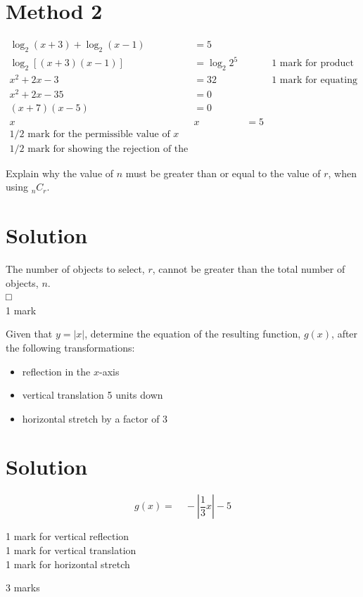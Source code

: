 \documentclass[10pt]{article}
\begin{document}
\section*{Method 2}
$$
\begin{array}{rlrl}
\log _{2}(x+3)+\log _{2}(x-1) & =5 & & \\
\log _{2}[(x+3)(x-1)] & =\log _{2} 2^{5} & & 1 \text { mark for product law } \\
x^{2}+2 x-3 & =32 & & 1 \text { mark for equating arguments } \\
x^{2}+2 x-35 & =0 & & \\
(x+7)(x-5) & =0 & & \\
x & x & =5 & \\
1 / 2 \text { mark for the permissible value of } x \\
1 / 2 \text { mark for showing the rejection of the extraneous root }
\end{array}
$$

Explain why the value of $n$ must be greater than or equal to the value of $r$, when using ${ }_{n} C_{r}$.

\section*{Solution}
The number of objects to select, $r$, cannot be greater than the total number of objects, $n$.\\
□\\
1 mark

Given that $y=|x|$, determine the equation of the resulting function, $g(x)$, after the following transformations:

\begin{itemize}
  \item reflection in the $x$-axis
  \item vertical translation 5 units down
  \item horizontal stretch by a factor of 3
\end{itemize}

\section*{Solution}
$$
g(x)=\quad-\left|\frac{1}{3} x\right|-5
$$

1 mark for vertical reflection\\
1 mark for vertical translation\\
1 mark for horizontal stretch

3 marks
\end{document}
